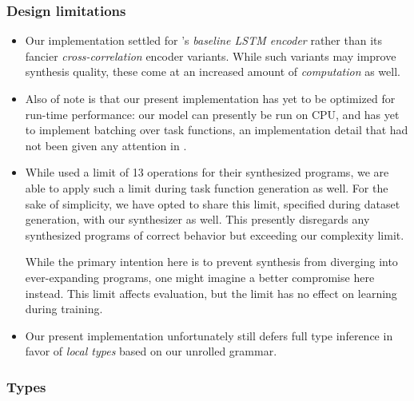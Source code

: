 \documentclass{article}
\begin{document}
\subsubsection{Design limitations}

\begin{itemize}
    \item Our implementation settled for \citet{nsps}'s \emph{baseline LSTM encoder} rather than its fancier \emph{cross-correlation} encoder variants.
    While such variants may improve synthesis quality,
    these come at an increased amount of \emph{computation} as well.
    \item Also of note is that our present implementation has yet to be optimized for run-time performance:
    our model can presently be run on CPU,
    and has yet to implement batching over task functions,
    an implementation detail that had not been given any attention in \citet{nsps}.
    \item While \citet{nsps} used a limit of 13 operations for their synthesized programs,
    we are able to apply such a limit during task function generation as well.
    For the sake of simplicity, we have opted to share this limit,
    specified during dataset generation,
    with our synthesizer as well.
    This presently disregards any synthesized programs of
    correct behavior but exceeding our complexity limit.

    While the primary intention here is to prevent synthesis
    from diverging into ever-expanding programs,
    one might imagine a better compromise here instead.
    This limit affects evaluation,
    but the limit has no effect on learning during training.
    \item Our present implementation unfortunately still defers full type inference in favor of \emph{local types} based on our unrolled grammar.
\end{itemize}

\subsubsection{Types} \label{sec:typednsps}

\end{document}

